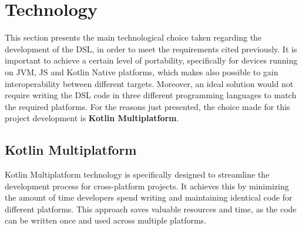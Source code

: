 \section{Technology}\label{section:technology_choices}
This section presents the main technological choice taken regarding the development of the DSL, in order to meet the requirements cited previously.\newline
It is important to achieve a certain level of portability, specifically for devices running on JVM, JS and Kotlin Native platforms, which makes also possible  to gain interoperability between different targets. Moreover, an ideal solution would not require writing the DSL code in three different programming languages to match the required platforms.\newline
For the reasons just presented, the choice made for this project development is \textbf{Kotlin Multiplatform}.

\subsection{Kotlin Multiplatform}
Kotlin Multiplatform technology is specifically designed to streamline the development process for cross-platform projects.\newline
It achieves this by minimizing the amount of time developers spend writing and maintaining identical code for different platforms. This approach saves valuable resources and time, as the code can be written once and used across multiple platforms.

